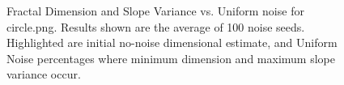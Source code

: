 \documentclass[12pt, oneside]{book}
\begin{document}
\begin{figure}[!b]
  \centering
  \caption[Fractal Dimension and Slope Variance vs. Uniform noise for circle.png.]{Fractal Dimension and Slope Variance vs. Uniform noise for circle.png.  Results shown are the average of 100 noise seeds.  Highlighted are initial no-noise dimensional estimate, and Uniform Noise percentages where minimum dimension and maximum slope variance occur.}
  \label{fig:circle_uniform_result}
\end{figure}
\end{document}
